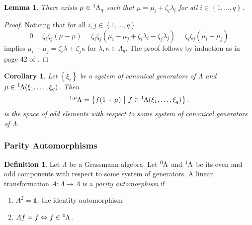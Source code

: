 \documentclass{article}
\newtheorem{lemma}{Lemma}
\newtheorem{corollary}{Corollary}[theorem]
\theoremstyle{definition}
\newtheorem{definition}{Definition}
\begin{document}
\begin{lemma}
    \label{lemma:1}
    There exists $\mu \in \tensor[^1]{\Lambda}{_q}$ such that $\mu = \mu_i + \zeta_i \lambda_i$ for all $i \in \left\{ 1, \dots, q \right\}$.
\end{lemma}
\begin{proof}
    Noticing that for all $i, j \in \left\{ 1, \dots, q \right\}$
    \begin{equation*}
        0 = \zeta_i \zeta_j (\mu - \mu)
        = \zeta_i \zeta_j (\mu_i - \mu_j + \zeta_i \lambda_i - \zeta_j \lambda_j)
        = \zeta_i \zeta_j (\mu_i - \mu_j)
    \end{equation*}
    implies $\mu_i - \mu_j = \zeta_i \lambda + \zeta_j \kappa$ for $\lambda, \kappa \in \Lambda_q$. The proof follows by induction as in page 42 of \cite{berezin_introduction_1987}.
\end{proof}

\begin{corollary}
    Let $\left\{ \xi_i \right\}$ be a system of canonical generators of $\Lambda$ and $\mu \in \tensor[^1]{\Lambda(\xi_1, \dots, \xi_q)}{}$. Then
    \begin{equation*}
        \tensor[^{1, \mu}]{\Lambda}{}
        = \left\{ f(1 + \mu) \ \middle| \ f \in \tensor[^1]{\Lambda(\xi_1, \dots, \xi_q)}{} \right\}.
    \end{equation*}
    is the space of odd elements with respect to some system of canonical generators of $\Lambda$.
\end{corollary}


\subsubsection{Parity Automorphisms}


\begin{definition}
    Let $\Lambda$ be a Grassmann algebra. Let $\tensor[^0]{\Lambda}{}$ and $\tensor[^1]{\Lambda}{}$ be its even and odd components with respect to some system of generators. A linear transformation $A: \Lambda \rightarrow \Lambda$ is a \emph{parity automorphism} if
    \begin{enumerate}
        \item $A^2 = \mathds{1}$, the identity automorphism
        \item $A f = f \Leftrightarrow f \in \tensor[^0]{\Lambda}{}$.
    \end{enumerate}
\end{definition}
\end{document}
